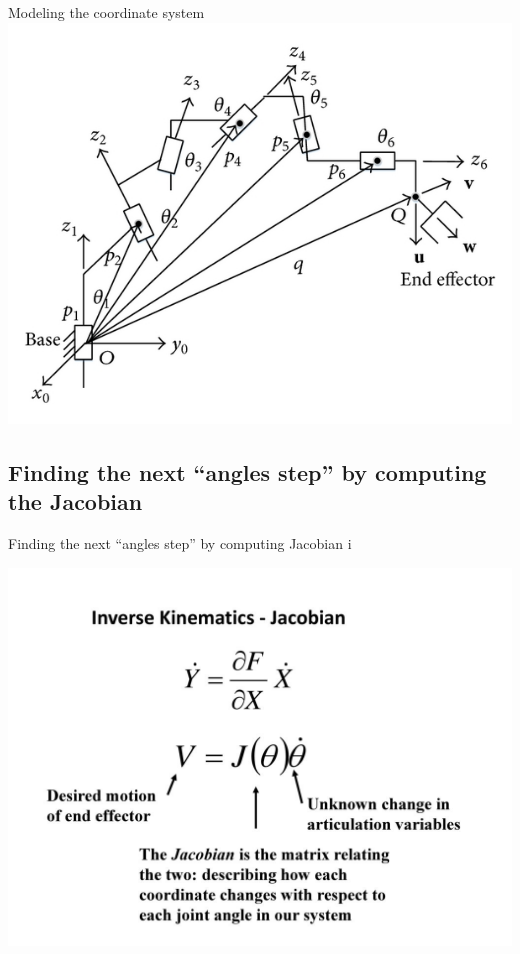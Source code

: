 \documentclass{beamer}
\begin{document}
\begin{frame}[allowframebreaks]{Modeling the coordinate system}
	\center
	\includegraphics[scale = 1.8]{A-6R-manipulator-with-normal-configuration.png}\cite{4}

\end{frame}

\subsection{Finding the next ``angles step'' by computing the Jacobian}
\begin{frame}{Finding the next ``angles step'' by computing Jacobian i}


	\includegraphics[scale = 1.2]{slide_30.jpg}\cite{5}
\end{frame}
\end{document}
